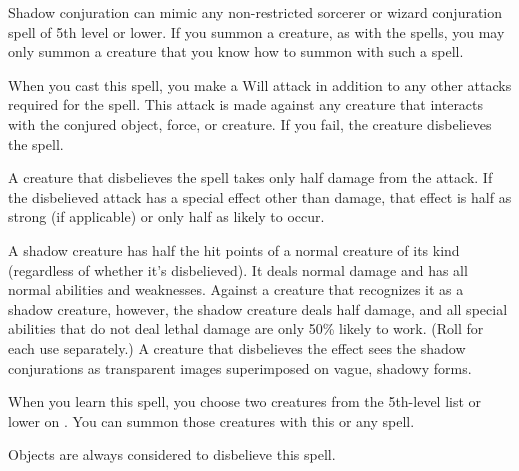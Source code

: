 \spelleffect Shadow conjuration can mimic any non-restricted sorcerer or wizard conjuration spell of 5th level or lower. If you summon a creature, as with the  spells, you may only summon a creature that you know how to summon with such a spell.
\par When you cast this spell, you make a Will attack in addition to any other attacks required for the spell. This attack is made against any creature that interacts with the conjured object, force, or creature. If you fail, the creature disbelieves the spell.
\par A creature that disbelieves the spell takes only half damage from the attack. If the disbelieved attack has a special effect other than damage, that effect is half as strong (if applicable) or only half as likely to occur.
\par A shadow creature has half the hit points of a normal creature of its kind (regardless of whether it's disbelieved). It deals normal damage and has all normal abilities and weaknesses. Against a creature that recognizes it as a shadow creature, however, the shadow creature deals half damage, and all special abilities that do not deal lethal damage are only 50\% likely to work. (Roll for each use separately.)
\spellnotes A creature that disbelieves the effect sees the shadow conjurations as transparent images superimposed on vague, shadowy forms.
\par When you learn this spell, you choose two creatures from the 5th-level list or lower on . You can summon those creatures with this or any  spell.
\par Objects are always considered to disbelieve this spell.

